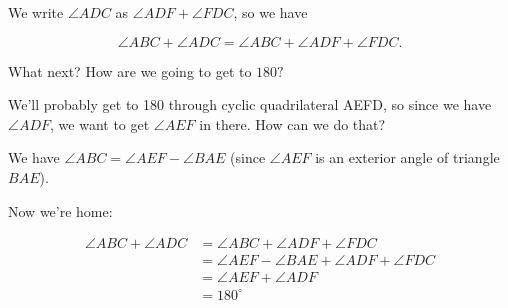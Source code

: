 

We write $\angle ADC$ as $\angle ADF + \angle FDC$, so we have

$$ \angle ABC + \angle ADC = \angle ABC + \angle ADF + \angle FDC. $$

What next? How are we going to get to $180?$


We'll probably get to 180 through cyclic quadrilateral AEFD, so since we have $\angle ADF$, we want to get $\angle AEF$ in there. How can we do that?



We have $\angle ABC = \angle AEF - \angle BAE$ (since $\angle AEF$ is an exterior angle of triangle $BAE$).





Now we're home:

\begin{align*}  
\angle ABC + \angle ADC &= \angle ABC + \angle ADF + \angle FDC\\  
&=\angle AEF -\angle BAE + \angle ADF +\angle FDC\\  
&=\angle AEF + \angle ADF\\  
&=180^\circ  
\end{align*}

